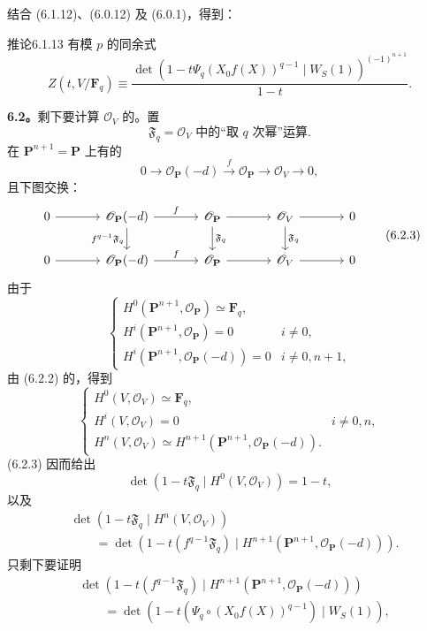 结合 (6.1.12)、(6.0.12) 及 (6.0.1)，得到：
\begin{SGAresult}{推论}{6.1.13}
有模 $p$ 的同余式
\[
Z(t,V/\mathbf F_q)\equiv
\frac{\det(1-t\Psi_q(X_0f(X))^{q-1}\mid W_S(1))^{(-1)^{n+1}}}{1-t}.
\]
\end{SGAresult}
\textbf{6.2。}剩下要计算 $\mathscr O_V$ 的。置
\[
\mathfrak F_q=\mathscr O_V\text{ 中的“取 }q\text{ 次幂”运算}.\tag{6.2.1}
\]
在 $\mathbf P^{n+1}=\mathbf P$ 上有的
\[
0\longrightarrow\mathscr O_{\mathbf P}(-d)\xrightarrow{f}\mathscr O_{\mathbf P}
\longrightarrow\mathscr O_V\longrightarrow0,\tag{6.2.2}
\]
且下图交换：
\[
\begin{tikzcd}[column sep=large]
0\arrow[r]&\mathscr O_{\mathbf P}(-d)\arrow[r,"f"]\arrow[d,"f^{q-1}\mathfrak F_q"']
&\mathscr O_{\mathbf P}\arrow[r]\arrow[d,"\mathfrak F_q"]
&\mathscr O_V\arrow[r]\arrow[d,"\mathfrak F_q"]&0\\
0\arrow[r]&\mathscr O_{\mathbf P}(-d)\arrow[r,"f"]&\mathscr O_{\mathbf P}\arrow[r]&\mathscr O_V\arrow[r]&0
\end{tikzcd}\tag{6.2.3}
\]
由于
\[
\begin{cases}
H^0(\mathbf P^{n+1},\mathscr O_{\mathbf P})\simeq\mathbf F_q,\\
H^i(\mathbf P^{n+1},\mathscr O_{\mathbf P})=0& i\ne0,\\
H^i(\mathbf P^{n+1},\mathscr O_{\mathbf P}(-d))=0& i\ne0,n+1,
\end{cases}\tag{6.2.4}
\]
由 (6.2.2) 的，得到
\[
\begin{cases}
H^0(V,\mathscr O_V)\simeq\mathbf F_q,\\
H^i(V,\mathscr O_V)=0& i\ne0,n,\\
H^n(V,\mathscr O_V)\simeq H^{n+1}(\mathbf P^{n+1},\mathscr O_{\mathbf P}(-d)).
\end{cases}\tag{6.2.5}
\]
 (6.2.3) 因而给出
\[
\det(1-t\mathfrak F_q\mid H^0(V,\mathscr O_V))=1-t,\tag{6.2.6}
\]
以及
\[
\begin{split}
&\det(1-t\mathfrak F_q\mid H^n(V,\mathscr O_V))\\
&\qquad=\det(1-t(f^{q-1}\mathfrak F_q)\mid H^{n+1}(\mathbf P^{n+1},\mathscr O_{\mathbf P}(-d))).
\end{split}\tag{6.2.7}
\]
只剩下要证明
\[
\begin{split}
&\det(1-t(f^{q-1}\mathfrak F_q)\mid H^{n+1}(\mathbf P^{n+1},\mathscr O_{\mathbf P}(-d)))\\
&\qquad=\det(1-t(\Psi_q\circ(X_0f(X))^{q-1})\mid W_S(1)),
\end{split}\tag{6.2.8}
\]
